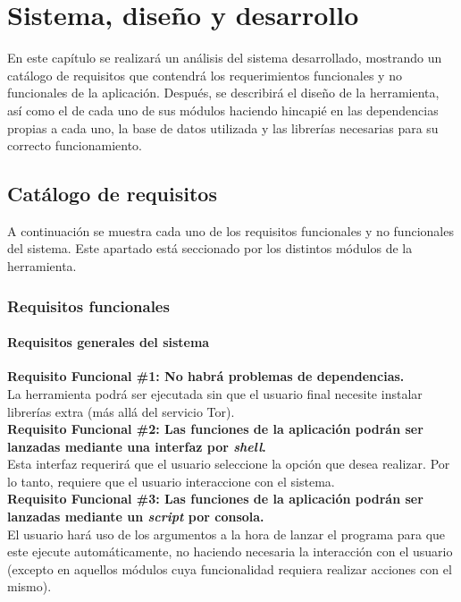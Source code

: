 \chapter{Sistema, diseño y desarrollo}
\label{chap:sistemadesarrollado}

En este capítulo se realizará un análisis del sistema desarrollado, mostrando un catálogo de requisitos que contendrá los requerimientos funcionales y no funcionales de la aplicación.
Después, se describirá el diseño de la herramienta, así como el de cada  uno  de  sus módulos haciendo hincapié en las dependencias propias a cada uno, la base de datos utilizada y las librerías necesarias para su correcto funcionamiento.

\section{Catálogo de requisitos}

A continuación se muestra cada uno de los requisitos funcionales y no funcionales del sistema. Este apartado está seccionado por los distintos módulos de la herramienta.

\subsection{Requisitos funcionales}
\subsubsection{Requisitos generales del sistema}
\begin{adjustwidth}{0.5cm}{}
\textbf{Requisito Funcional \#1: No habrá problemas de dependencias.}\\
La herramienta podrá ser ejecutada sin que el usuario final necesite instalar librerías extra (más allá del servicio Tor).\\
\linebreak
\textbf{Requisito Funcional \#2: Las funciones de la aplicación podrán ser lanzadas mediante una interfaz por \textit{shell}.}\\
Esta interfaz requerirá que el usuario seleccione la opción que desea realizar. Por lo tanto, requiere que el usuario interaccione con el sistema.\\	
\linebreak
\textbf{Requisito Funcional \#3: Las funciones de la aplicación podrán ser lanzadas mediante un \textit{script} por consola.}\\
El usuario hará uso de los argumentos a la hora de lanzar el programa para que este ejecute automáticamente, no haciendo necesaria la interacción con el usuario (excepto en aquellos módulos cuya funcionalidad requiera realizar acciones con el mismo).\\
\linebreak
\end{adjustwidth}
